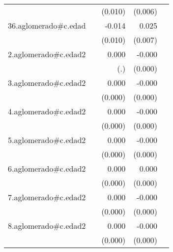 {\begin{longtable}{l*{4}{D{.}{.}{-1}}}
            &                     &     (0.010)         &     (0.006)         &                     \\
\addlinespace
36.aglomerado#c.edad&                     &      -0.014         &       0.025\sym{***}&                     \\
            &                     &     (0.010)         &     (0.007)         &                     \\
\addlinespace
2.aglomerado#c.edad2&                     &       0.000         &      -0.000\sym{***}&                     \\
            &                     &         (.)         &     (0.000)         &                     \\
\addlinespace
3.aglomerado#c.edad2&                     &       0.000         &      -0.000\sym{***}&                     \\
            &                     &     (0.000)         &     (0.000)         &                     \\
\addlinespace
4.aglomerado#c.edad2&                     &       0.000\sym{*}  &      -0.000\sym{**} &                     \\
            &                     &     (0.000)         &     (0.000)         &                     \\
\addlinespace
5.aglomerado#c.edad2&                     &       0.000\sym{*}  &      -0.000         &                     \\
            &                     &     (0.000)         &     (0.000)         &                     \\
\addlinespace
6.aglomerado#c.edad2&                     &       0.000\sym{*}  &       0.000         &                     \\
            &                     &     (0.000)         &     (0.000)         &                     \\
\addlinespace
7.aglomerado#c.edad2&                     &       0.000         &      -0.000\sym{*}  &                     \\
            &                     &     (0.000)         &     (0.000)         &                     \\
\addlinespace
8.aglomerado#c.edad2&                     &       0.000\sym{**} &      -0.000         &                     \\
            &                     &     (0.000)         &     (0.000)         &                     \\

\end{longtable}}
